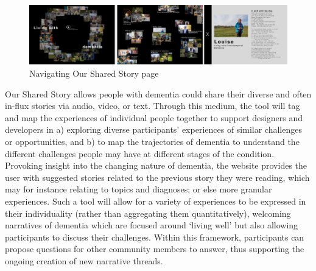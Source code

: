 \begin{figure}[h]
\centering
\includegraphics[width=1\linewidth]{Images/D3Toolkit/Fig5.png}
\caption{Navigating Our Shared Story page}
\label{fig:OurSharedStory}
\end{figure}
Our Shared Story allows people with dementia could share their diverse and often in-flux stories via audio, video, or text. Through this medium, the tool will tag and map the experiences of individual people together to support designers and developers in a) exploring diverse participants’ experiences of similar challenges or opportunities, and b) to map the trajectories of dementia to understand the different challenges people may have at different stages of the condition. Provoking insight into the changing nature of dementia, the website provides the user with suggested stories related to the previous story they were reading, which may for instance relating to topics and diagnoses; or else more granular experiences. Such a tool will allow for a variety of experiences to be expressed in their individuality (rather than aggregating them quantitatively), welcoming narratives of dementia which are focused around ‘living well’ but also allowing participants to discuss their challenges. Within this framework, participants can propose questions for other community members to answer, thus supporting the ongoing creation of new narrative threads. 

